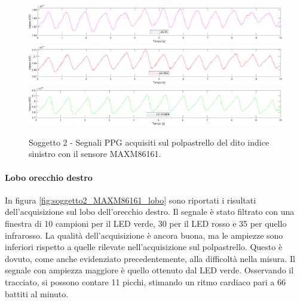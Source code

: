 \begin{figure}[h]
	\centering
	\includegraphics[width=1\linewidth]{ImageFiles/Misure Preliminari/Soggetto 2/maxm86161/polpastrello_ir_moving_avg}
	\includegraphics[width=1\linewidth]{ImageFiles/Misure Preliminari/Soggetto 2/maxm86161/polpastrello_red_moving_avg}
	\includegraphics[width=1\linewidth]{ImageFiles/Misure Preliminari/Soggetto 2/maxm86161/polpastrello_green_moving_avg}
	\caption{Soggetto 2 - Segnali PPG acquisiti sul polpastrello del dito indice sinistro con il sensore MAXM86161.}
	\label{fig:soggetto2_MAXM86161_polpastrello}
\end{figure}

\clearpage

\paragraph{Lobo orecchio destro}
In figura \ref{fig:soggetto2_MAXM86161_lobo} sono riportati i risultati dell'acquisizione sul lobo dell'orecchio destro. Il segnale è stato filtrato con una finestra di 10 campioni per il LED verde, 30 per il LED rosso e 35 per quello infrarosso. La qualità dell'acquisizione è ancora buona, ma le ampiezze sono inferiori rispetto a quelle rilevate nell'acquisizione sul polpastrello. Questo è dovuto, come anche evidenziato precedentemente, alla difficoltà nella misura. Il segnale con ampiezza maggiore è quello ottenuto dal LED verde. Osservando il tracciato, si possono contare 11 picchi, stimando un ritmo cardiaco pari a 66 battiti al minuto.

